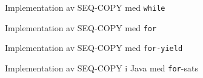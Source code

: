 \begin{Slide}{Implementation av SEQ-COPY med \texttt{while}}

\end{Slide}

\begin{Slide}{Implementation av SEQ-COPY med \texttt{for}}

\end{Slide}

\begin{Slide}{Implementation av SEQ-COPY med \texttt{for-yield}}

\end{Slide}

\begin{Slide}{Implementation av SEQ-COPY i Java med \texttt{for}-sats}
\vspace{-0.6em}
\end{Slide}










\fi








